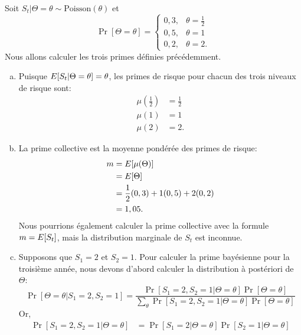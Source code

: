 \begin{exemple}
  \label{ex:bayesienne:poisson-discrete}
  Soit $S_t|\Theta = \theta \sim \text{Poisson}(\theta)$ et
  \begin{equation*}
    \Pr[\Theta = \theta] =
    \begin{cases}
      0,3, & \theta = \frac{1}{2} \\
      0,5, & \theta = 1 \\
      0,2, & \theta = 2.
    \end{cases}
  \end{equation*}
  Nous allons calculer les trois primes définies précédemment.

  \begin{enumerate}[a)]
  \item Puisque $E [ S_t|\Theta = \theta ] = \theta$, les primes de
    risque pour chacun des trois niveaux de risque sont:
    \begin{align*}
      \mu({\tfrac{1}{2}}) &= \tfrac{1}{2} \\
      \mu(1) &= 1 \\
      \mu(2) &= 2.
    \end{align*}
  \item La prime collective est la moyenne pondérée des primes de
    risque:
    \begin{align*}
      m
      &= E [ \mu(\Theta) ] \\
      &= E [ \Theta ] \\
      &= \frac{1}{2} (0,3) + 1 (0,5) + 2 (0,2) \\
      &= 1,05.
    \end{align*}
    Nous pourrions également calculer la prime collective avec la
    formule $m = E [ S_t ]$, mais la distribution marginale de $S_t$
    est inconnue.
  \item Supposons que $S_1 = 2$ et $S_2 = 1$. Pour calculer la prime
    bayésienne pour la troisième année, nous devons d'abord calculer
    la distribution à postériori de $\Theta$:
    \begin{equation*}
      \Pr[\Theta = \theta|S_1 = 2, S_2 = 1] =
      \frac{\Pr[S_1 = 2, S_2 = 1|\Theta = \theta] \Pr[\Theta = \theta]}
      {\sum_{\theta} \Pr[S_1 = 2, S_2 = 1|\Theta = \theta] \Pr[\Theta = \theta]}
    \end{equation*}
    Or,
    \begin{align*}
      \Pr[S_1 = 2, S_2 = 1|\Theta = \theta]
      &= \Pr[S_1 = 2|\Theta = \theta] \Pr[S_2 = 1|\Theta = \theta] \\

\end{align*}
\end{enumerate}
\end{exemple}
